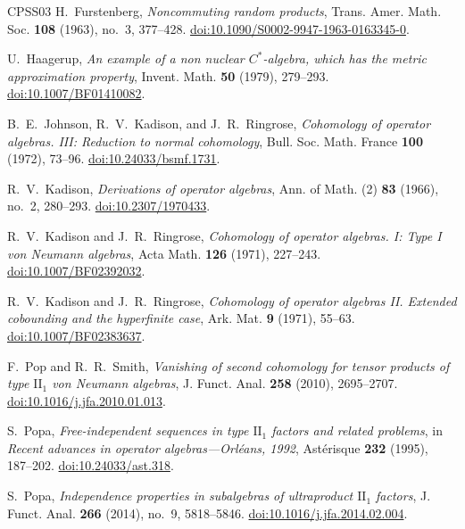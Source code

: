 \begin{thebibliography}{CPSS03}
H.~Furstenberg,
\emph{Noncommuting random products},
Trans. Amer. Math. Soc. \textbf{108} (1963), no.~3, 377--428.
\href{https://doi.org/10.1090/S0002-9947-1963-0163345-0}{doi:10.1090/S0002-9947-1963-0163345-0}.

U.~Haagerup,
\emph{An example of a non nuclear $C^*$-algebra, which has the metric
approximation property},
Invent. Math. \textbf{50} (1979), 279--293.
\href{https://doi.org/10.1007/BF01410082}{doi:10.1007/BF01410082}.

B.~E.~Johnson, R.~V.~Kadison, and J.~R.~Ringrose,
\emph{Cohomology of operator algebras. III: Reduction to normal cohomology},
Bull. Soc. Math. France \textbf{100} (1972), 73--96.
\href{https://doi.org/10.24033/bsmf.1731}{doi:10.24033/bsmf.1731}.

R.~V.~Kadison,
\emph{Derivations of operator algebras},
Ann. of Math. (2) \textbf{83} (1966), no.~2, 280--293.
\href{https://doi.org/10.2307/1970433}{doi:10.2307/1970433}.

R.~V.~Kadison and J.~R.~Ringrose,
\emph{Cohomology of operator algebras. I: Type I von Neumann algebras},
Acta Math. \textbf{126} (1971), 227--243.
\href{https://doi.org/10.1007/BF02392032}{doi:10.1007/BF02392032}.

R.~V.~Kadison and J.~R.~Ringrose,
\emph{Cohomology of operator algebras II. Extended cobounding and
the hyperfinite case},
Ark. Mat. \textbf{9} (1971), 55--63.
\href{https://doi.org/10.1007/BF02383637}{doi:10.1007/BF02383637}.

F.~Pop and R.~R.~Smith,
\emph{Vanishing of second cohomology for tensor products of type
$\mathrm{II}_1$ von Neumann algebras},
J. Funct. Anal. \textbf{258} (2010), 2695--2707.
\href{https://doi.org/10.1016/j.jfa.2010.01.013}{doi:10.1016/j.jfa.2010.01.013}.

S.~Popa,
\emph{Free-independent sequences in type $\mathrm{II}_1$ factors
and related problems},
in \emph{Recent advances in operator algebras---Orl\'eans, 1992},
Ast\'erisque \textbf{232} (1995), 187--202.
\href{https://doi.org/10.24033/ast.318}{doi:10.24033/ast.318}.

S.~Popa,
\emph{Independence properties in subalgebras of ultraproduct
$\mathrm{II}_1$ factors},
J. Funct. Anal. \textbf{266} (2014), no.~9, 5818--5846.
\href{https://doi.org/10.1016/j.jfa.2014.02.004}{doi:10.1016/j.jfa.2014.02.004}.


\end{thebibliography}
